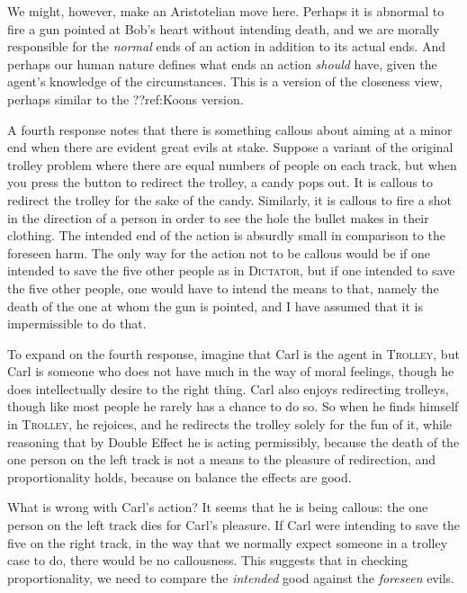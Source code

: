 We might, however, make an Aristotelian move here. Perhaps it is abnormal to fire a gun pointed at Bob's heart without intending
death, and we are morally responsible for the \textit{normal} ends of an action in addition to its actual ends. And perhaps
our human nature defines what ends an action \textit{should} have, given the agent's knowledge of the circumstances.
This is a version of the closeness view, perhaps similar to the ??ref:Koons version. 

A fourth response notes that there is something callous about aiming at a minor end when there are evident great evils at stake.
Suppose a variant of the original trolley problem where there are equal numbers of people on each track, but when you press the
button to redirect the trolley, a candy pops out. It is callous to redirect the trolley for the sake of the candy. Similarly,
it is callous to fire a shot in the direction of a person in order to see the hole the bullet makes in their clothing. The intended 
end of the action is absurdly small in comparison to the foreseen harm. The only way for the action not to be callous would be if 
one intended to save the five other people as in \textsc{Dictator}, but if one intended to save the five other people, one would 
have to intend the means to that, namely the death of the one at whom the gun is pointed, and I have assumed that it is impermissible
to do that. 

To expand on the fourth response, imagine that Carl is the agent in \textsc{Trolley}, but Carl is someone who does not have much
in the way of moral feelings, though he does intellectually desire to the right thing. Carl also enjoys redirecting trolleys, 
though like most people he rarely has a chance to do so. So when he finds himself in \textsc{Trolley}, he rejoices, and he
redirects the trolley solely for the fun of it, while reasoning that by Double Effect he is acting permissibly, because the
death of the one person on the left track is not a means to the pleasure of redirection, and proportionality holds, because
on balance the effects are good. 

What is wrong with Carl's action? It seems that he is being callous: the one person on the left track dies for Carl's pleasure.
If Carl were intending to save the five on the right track, in the way that we normally expect someone in a trolley case to do, 
there would be no callousness. This suggests that in checking proportionality, we need to compare the \textit{intended} good 
against the \textit{foreseen} evils. 

